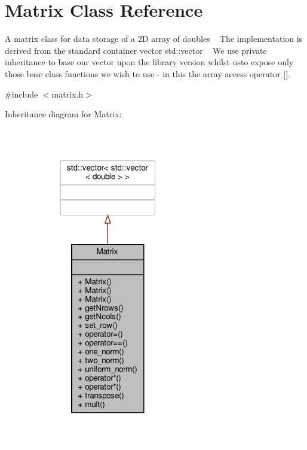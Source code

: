 \hypertarget{classMatrix}{}\section{Matrix Class Reference}
\label{classMatrix}


A matrix class for data storage of a 2D array of doubles ~\newline
 The implementation is derived from the standard container vector std\+::vector ~\newline
 We use private inheritance to base our vector upon the library version whilst  usto expose only those base class functions we wish to use -\/ in this  the array access operator \mbox{[}\mbox{]}.  




{\ttfamily \#include $<$matrix.\+h$>$}



Inheritance diagram for Matrix\+:
\nopagebreak
\begin{figure}[H]
\begin{center}
\leavevmode
\includegraphics[width=199pt]{classMatrix__inherit__graph}
\end{center}
\end{figure}


